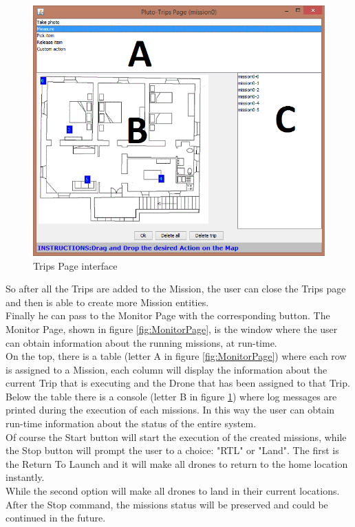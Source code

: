 \begin{figure}[H]
  \centering
  \includegraphics[width=\linewidth]{pictures/TripsPage.png}
  \caption{Trips Page interface}
  \label{fig:TripsPage}
\end{figure}

So after all the Trips are added to the Mission, the user can close the Trips page and then is able to create more Mission entities.
\\
Finally he can pass to the Monitor Page with the corresponding button.
The Monitor Page, shown in figure \ref{fig:MonitorPage}, is the window where the user can obtain information about the running missions, at run-time.
\\
On the top, there is a table (letter A in figure \ref{fig:MonitorPage}) where each row is assigned to a Mission, each column will display the information about the current Trip that is executing and the Drone that has been assigned to that Trip.
\\
Below the table there is a console (letter B in figure \ref{fig:TripsPage}) where log messages are printed during the execution of each missions. In this way the user can obtain run-time information about the status of the entire system.
\\

Of course the Start button will start the execution of the created missions, while the Stop button will prompt the user to a choice: "RTL" or "Land". The first is the Return To Launch and it will make all drones to return to the home location instantly.
\\
While the second option will make all drones to land in their current locations. After the Stop command, the missions status will be preserved and could be continued in the future.

